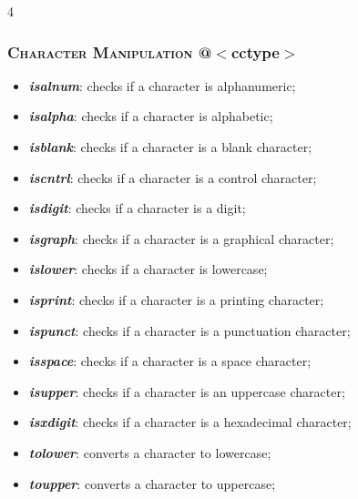 \documentclass[10pt]{article}
\begin{document}
\begin{multicols*}{4}
{\subsubsection*{\textsc{Character Manipulation}  @$<$cctype$>$} 
\begin{itemize}[leftmargin=*,topsep=0.25pt]
  \setlength\itemsep{-1.8pt}
\item  \emph{\textbf{isalnum}}: checks if a character is alphanumeric;
\item  \emph{\textbf{isalpha}}: checks if a character is alphabetic;
\item  \emph{\textbf{isblank}}: checks if a character is a blank character;
\item  \emph{\textbf{iscntrl}}: checks if a character is a control character;
\item  \emph{\textbf{isdigit}}: checks if a character is a digit;
\item  \emph{\textbf{isgraph}}: checks if a character is a graphical character;
\item  \emph{\textbf{islower}}: checks if a character is lowercase;
\item  \emph{\textbf{isprint}}: checks if a character is a printing character;
\item  \emph{\textbf{ispunct}}: checks if a character is a punctuation character;
\item  \emph{\textbf{isspace}}: checks if a character is a space character;
\item  \emph{\textbf{isupper}}: checks if a character is an uppercase character;
\item  \emph{\textbf{isxdigit}}: checks if a character is a hexadecimal character;
\item  \emph{\textbf{tolower}}: converts a character to lowercase;
\item  \emph{\textbf{toupper}}: converts a character to uppercase;
\end{itemize}

}
\end{multicols*}
\end{document}
